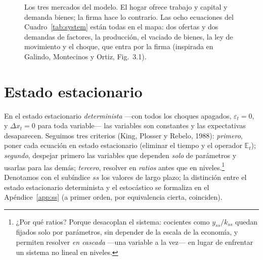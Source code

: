 \documentclass[11pt,a4paper]{report}
\newcommand{\E}{\mathbb{E}}
\begin{document}
\begin{figure}[H]
\caption{Los tres mercados del modelo. El hogar ofrece trabajo y capital y demanda
bienes; la firma hace lo contrario. Las ocho ecuaciones del Cuadro~\ref{tab:system}
están todas en el mapa: dos ofertas y dos demandas de factores, la producción, el
vaciado de bienes, la ley de movimiento y el choque, que entra por la firma
(inspirada en Galindo, Montecinos y Ortiz, Fig.~3.1).}
\label{fig:tresmercados}
\end{figure}

\section{Estado estacionario}
\label{sec:ss}

En el estado estacionario \emph{determinista} ---con todos los choques apagados,
$\varepsilon_t=0$, y $\Delta x_t=0$ para toda variable--- las variables son
constantes y las expectativas desaparecen. Seguimos tres criterios (King, Plosser y
Rebelo, 1988): \emph{primero}, poner cada ecuación en estado estacionario (eliminar el
tiempo y el operador $\E_t$); \emph{segundo}, despejar primero las variables que
dependen \emph{solo} de parámetros y usarlas para las demás; \emph{tercero}, resolver
en \emph{ratios} antes que en niveles.\footnote{¿Por qué ratios? Porque desacoplan el
sistema: cocientes como $y_{ss}/k_{ss}$ quedan fijados solo por parámetros, sin
depender de la escala de la economía, y permiten resolver \emph{en cascada} ---una
variable a la vez--- en lugar de enfrentar un sistema no lineal en niveles.} Denotamos
con el subíndice $ss$ los valores de largo plazo; la distinción entre el estado
estacionario determinista y el estocástico se formaliza en el Apéndice~\ref{app:ss}
(a primer orden, por equivalencia cierta, coinciden).
\end{document}
